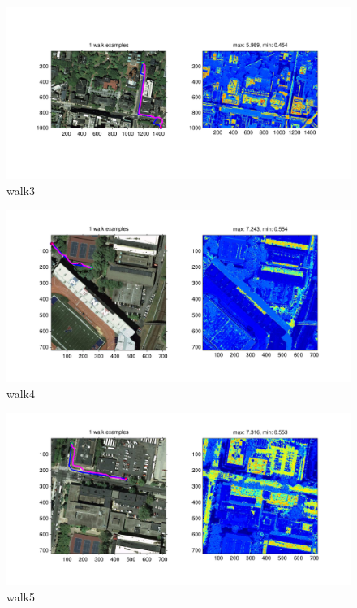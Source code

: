 \documentclass[twoside]{article}
\begin{document}
\begin{multicols}{2}
\begin{figure}[H]
\centering
\includegraphics[width=\columnwidth]{fig/walk3.pdf}
\caption{walk3}
\label{fig:walk3}
\end{figure}

\begin{figure}[H]
\centering
\includegraphics[width=\columnwidth]{fig/walk4.pdf}
\caption{walk4}
\label{fig:walk4}
\end{figure}

\begin{figure}[H]
\centering
\includegraphics[width=\columnwidth]{fig/walk5.pdf}
\caption{walk5}
\label{fig:walk5}
\end{figure}


\end{multicols}
\end{document}
